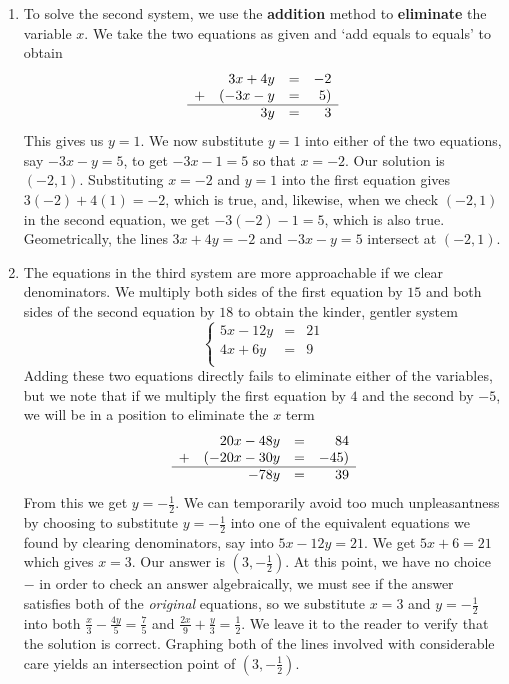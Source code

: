 \documentclass{ximera}
\begin{document}
\begin{example}
\begin{explanation}
\begin{enumerate}
\item  To solve the second system, we use the \textbf{addition} method to \textbf{eliminate} the variable $x$.  We take the two equations as given and `add equals to equals' to obtain \[ \begin{array}{lrcr} & 3x+4y & = & -2  \\ + & (-3x-y  & = & 5 ) \\ \hline & 3y & = & 3\end{array}\] This gives us $y = 1$.  We now substitute $y=1$ into either of the two equations, say $-3x-y = 5$, to get $-3x-1 = 5$ so that $x = -2$.  Our solution is $(-2,1)$.  Substituting $x=-2$ and $y=1$ into the first equation gives $3(-2) + 4(1) = -2$, which is true, and, likewise, when we check $(-2, 1)$ in the second equation, we get $-3(-2) - 1 = 5$, which is also true.  Geometrically, the lines $3x+4y = -2$ and $-3x-y=5$ intersect at $(-2,1)$.

\begin{center}
\end{center}


\item  The equations in the third system are more approachable if we clear denominators.  We multiply both sides of the first equation by $15$ and both sides of the second equation by $18$ to obtain the kinder, gentler system \[\left\{ \begin{array}{rcr} 5x - 12y & = & 21  \\ 4x  + 6y & = & 9 \\ \end{array} \right.\]  Adding these two equations directly fails to eliminate either of the variables, but we note that if we multiply the first equation by $4$ and the second by $-5$, we will be in a position to eliminate the $x$ term \[ \begin{array}{lrcr} & 20x-48y & = & 84  \\ + & (-20x-30y  & = & -45 ) \\ \hline  & -78y & = & 39\end{array}\] From this we get $y = -\frac{1}{2}$.  We can temporarily avoid too much unpleasantness by choosing to substitute $y = -\frac{1}{2}$ into one of the equivalent equations we found by clearing denominators, say into $5x - 12y  =  21$.  We get $5x + 6 = 21$ which gives $x=3$.  Our answer is $\left(3, -\frac{1}{2}\right)$.  At this point, we have no choice $-$ in order to check an answer algebraically, we must see if the answer satisfies both of the \textit{original} equations, so we substitute $x = 3$ and $y = -\frac{1}{2}$ into both $\frac{x}{3} -\frac{4y}{5} = \frac{7}{5}$ and $\frac{2x}{9} + \frac{y}{3} = \frac{1}{2}$.  We leave it to the reader to verify that the solution is correct.  Graphing both of the lines involved with considerable care yields an intersection point of $\left(3, -\frac{1}{2}\right)$.


\end{enumerate}
\end{explanation}
\end{example}
\end{document}
